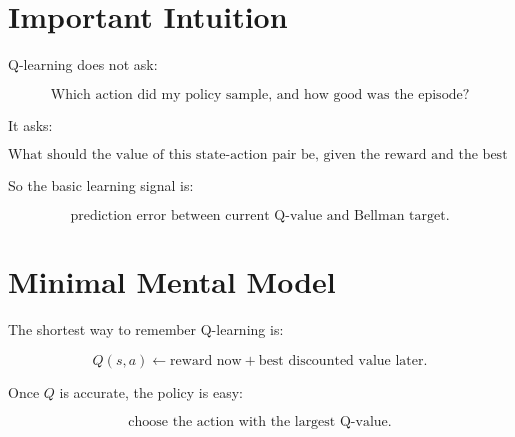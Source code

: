 \documentclass[11pt]{article}
\begin{document}
\section{Important Intuition}

Q-learning does not ask:

\[
\text{Which action did my policy sample, and how good was the episode?}
\]

It asks:

\[
\text{What should the value of this state-action pair be,
given the reward and the best future action?}
\]

So the basic learning signal is:

\[
\boxed{
\text{prediction error between current Q-value and Bellman target.}
}
\]

\section{Minimal Mental Model}

The shortest way to remember Q-learning is:

\[
\boxed{
Q(s,a) \leftarrow \text{reward now} + \text{best discounted value later}.
}
\]

Once $Q$ is accurate, the policy is easy:

\[
\boxed{
\text{choose the action with the largest Q-value.}
}
\]
\end{document}
